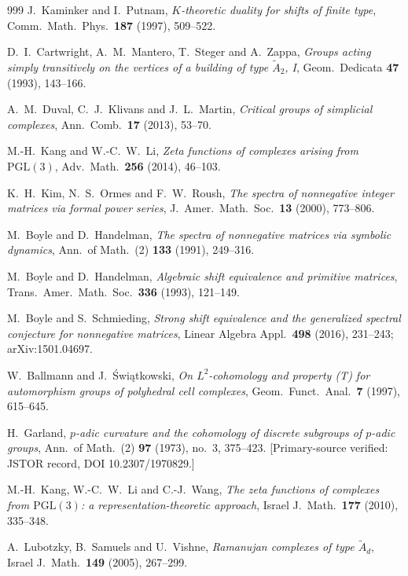 \begin{thebibliography}{999}
 J.~Kaminker and I.~Putnam, \emph{$K$-theoretic duality for shifts of finite type}, Comm.\ Math.\ Phys.\ \textbf{187} (1997), 509--522.

 D.~I.~Cartwright, A.~M.~Mantero, T.~Steger and A.~Zappa, \emph{Groups acting simply transitively on the vertices of a building of type $\widetilde A_2$, I}, Geom.\ Dedicata \textbf{47} (1993), 143--166.

 A.~M.~Duval, C.~J.~Klivans and J.~L.~Martin, \emph{Critical groups of simplicial complexes}, Ann.\ Comb.\ \textbf{17} (2013), 53--70.

 M.-H.~Kang and W.-C.~W.~Li, \emph{Zeta functions of complexes arising from $\mathrm{PGL}(3)$}, Adv.\ Math.\ \textbf{256} (2014), 46--103.

 K.~H.~Kim, N.~S.~Ormes and F.~W.~Roush, \emph{The spectra of nonnegative integer matrices via formal power series}, J.\ Amer.\ Math.\ Soc.\ \textbf{13} (2000), 773--806.

 M.~Boyle and D.~Handelman, \emph{The spectra of nonnegative matrices via symbolic dynamics}, Ann.\ of Math.\ (2) \textbf{133} (1991), 249--316.

 M.~Boyle and D.~Handelman, \emph{Algebraic shift equivalence and primitive matrices}, Trans.\ Amer.\ Math.\ Soc.\ \textbf{336} (1993), 121--149.

 M.~Boyle and S.~Schmieding, \emph{Strong shift equivalence and the generalized spectral conjecture for nonnegative matrices}, Linear Algebra Appl.\ \textbf{498} (2016), 231--243; arXiv:1501.04697.

 W.~Ballmann and J.~\'Swi\k{a}tkowski, \emph{On $L^{2}$-cohomology and property (T) for automorphism groups of polyhedral cell complexes}, Geom.\ Funct.\ Anal.\ \textbf{7} (1997), 615--645.

 H.~Garland, \emph{$p$-adic curvature and the cohomology of discrete subgroups of $p$-adic groups}, Ann.\ of Math.\ (2) \textbf{97} (1973), no.~3, 375--423. [Primary-source verified: JSTOR record, DOI 10.2307/1970829.]

 M.-H.~Kang, W.-C.~W.~Li and C.-J.~Wang, \emph{The zeta functions of complexes from $\mathrm{PGL}(3)$: a representation-theoretic approach}, Israel J.\ Math.\ \textbf{177} (2010), 335--348.

 A.~Lubotzky, B.~Samuels and U.~Vishne, \emph{Ramanujan complexes of type $\widetilde A_d$}, Israel J.\ Math.\ \textbf{149} (2005), 267--299.


\end{thebibliography}
